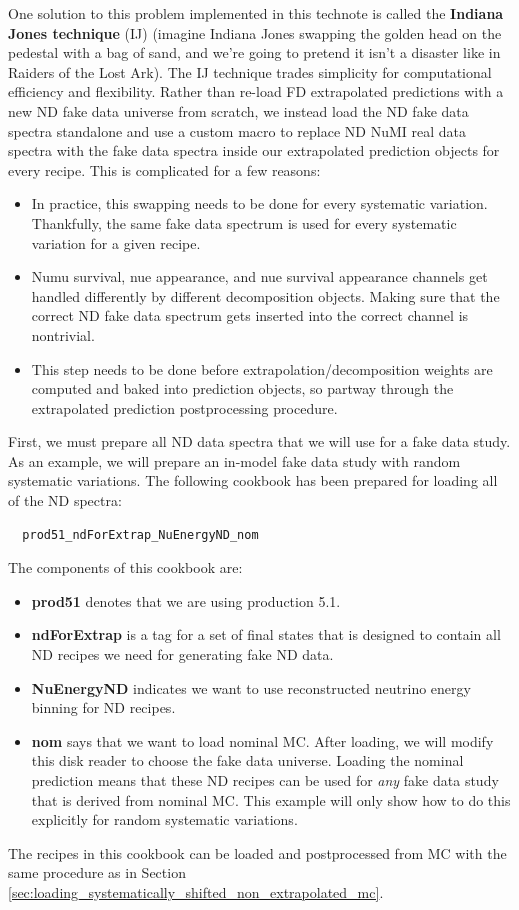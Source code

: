 \documentclass{article}
\begin{document}
One solution to this problem implemented in this technote is called the \textbf{Indiana Jones technique} (IJ) (imagine Indiana Jones swapping the golden head on the pedestal with a bag of sand, and we're going to pretend it isn't a disaster like in Raiders of the Lost Ark).
The IJ technique trades simplicity for computational efficiency and flexibility. Rather than re-load FD extrapolated predictions with a new ND fake data universe from scratch, we instead load the ND fake data spectra standalone and use a custom macro to replace ND NuMI real data spectra with the fake data spectra inside our extrapolated prediction objects for every recipe. This is complicated for a few reasons:
\begin{itemize}
  \item In practice, this swapping needs to be done for every systematic variation. Thankfully, the same fake data spectrum is used for every systematic variation for a given recipe.
  \item Numu survival, nue appearance, and nue survival appearance channels get handled differently by different decomposition objects. Making sure that the correct ND fake data spectrum gets inserted into the correct channel is nontrivial.
  \item This step needs to be done before extrapolation/decomposition weights are computed and baked into prediction objects, so partway through the extrapolated prediction postprocessing procedure.
\end{itemize}

First, we must prepare all ND data spectra that we will use for a fake data study. As an example, we will prepare an in-model fake data study with random systematic variations. The following cookbook has been prepared for loading all of the ND spectra:
\begin{verbatim}
  prod51_ndForExtrap_NuEnergyND_nom
\end{verbatim}
The components of this cookbook are:
\begin{itemize}
  \item \textbf{prod51} denotes that we are using production 5.1.
  \item \textbf{ndForExtrap} is a tag for a set of final states that is designed to contain all ND recipes we need for generating fake ND data.
  \item \textbf{NuEnergyND} indicates we want to use reconstructed neutrino energy binning for ND recipes.
  \item \textbf{nom} says that we want to load nominal MC. After loading, we will modify this disk reader to choose the fake data universe. Loading the nominal prediction means that these ND recipes can be used for \textit{any} fake data study that is derived from nominal MC. This example will only show how to do this explicitly for random systematic variations.
\end{itemize}
The recipes in this cookbook can be loaded and postprocessed from MC with the same procedure as in Section \ref{sec:loading_systematically_shifted_non_extrapolated_mc}.
\end{document}
